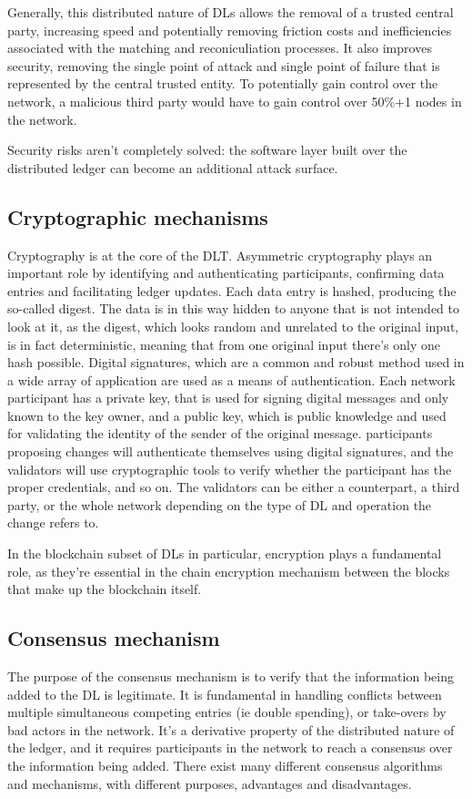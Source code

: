 Generally, this distributed nature of DLs allows the removal of a trusted central party, increasing speed and potentially removing friction costs and inefficiencies associated with the matching and reconiculiation processes. It also improves security, removing the single point of attack and single point of failure that is represented by the central trusted entity. To potentially gain control over the network, a malicious third party would have to gain control over 50\%+1 nodes in the network. 

Security risks aren't completely solved: the software layer built over the distributed ledger can become an additional attack surface.

\subsection{Cryptographic mechanisms}

Cryptography is at the core of the DLT. Asymmetric cryptography plays an important role by identifying and authenticating participants, confirming data entries and facilitating ledger updates.
Each data entry is hashed, producing the so-called digest. The data is in this way hidden to anyone that is not intended to look at it, as the digest, which looks random and unrelated to the original input, is in fact deterministic, meaning that from one original input there's only one hash possible. Digital signatures, which are a common and robust method used in a wide array of application are used as a means of authentication. Each network participant has a private key, that is used for signing digital messages and only known to the key owner, and a public key, which is public knowledge and used for validating the identity of the sender of the original message.
participants proposing changes will authenticate themselves using digital signatures, and the validators will use cryptographic tools to verify whether the participant has the proper credentials, and so on. The validators can be either a counterpart, a third party, or the whole network depending on the type of DL and operation the change refers to.

In the blockchain subset of DLs in particular, encryption plays a fundamental role, as they're essential in the chain encryption mechanism between the blocks that make up the blockchain itself.


\subsection{Consensus mechanism}
\label{sec:consensus}
The purpose of the consensus mechanism is to verify that the information being added to the DL is legitimate. It is fundamental in handling conflicts between multiple simultaneous competing entries (ie double spending), or take-overs by bad actors in the network. It's a derivative property of the distributed nature of the ledger, and it requires participants in the network to reach a consensus over the information being added. There exist many different consensus algorithms and mechanisms, with different purposes, advantages and disadvantages. \\

